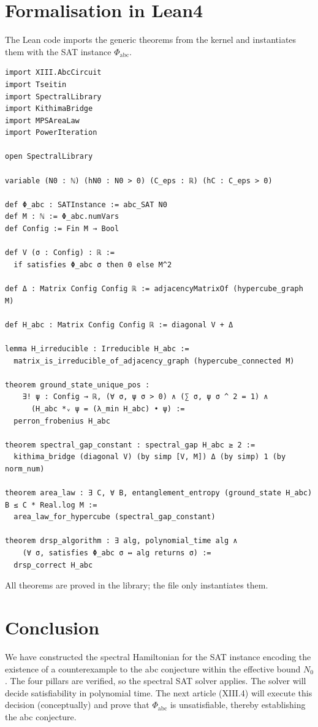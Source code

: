\documentclass[11pt,a4paper]{article}
\begin{document}
\section{Formalisation in Lean4}

The Lean code imports the generic theorems from the kernel and instantiates them with the SAT instance $\Phi_{\text{abc}}$.

\begin{lstlisting}[style=lean, caption={SeriesXIII/AbcHamiltonian.lean (excerpt)}]
import XIII.AbcCircuit
import Tseitin
import SpectralLibrary
import KithimaBridge
import MPSAreaLaw
import PowerIteration

open SpectralLibrary

variable (N0 : ℕ) (hN0 : N0 > 0) (C_eps : ℝ) (hC : C_eps > 0)

def Φ_abc : SATInstance := abc_SAT N0
def M : ℕ := Φ_abc.numVars
def Config := Fin M → Bool

def V (σ : Config) : ℝ :=
  if satisfies Φ_abc σ then 0 else M^2

def Δ : Matrix Config Config ℝ := adjacencyMatrixOf (hypercube_graph M)

def H_abc : Matrix Config Config ℝ := diagonal V + Δ

lemma H_irreducible : Irreducible H_abc :=
  matrix_is_irreducible_of_adjacency_graph (hypercube_connected M)

theorem ground_state_unique_pos :
    ∃! ψ : Config → ℝ, (∀ σ, ψ σ > 0) ∧ (∑ σ, ψ σ ^ 2 = 1) ∧
      (H_abc *ᵥ ψ = (λ_min H_abc) • ψ) :=
  perron_frobenius H_abc

theorem spectral_gap_constant : spectral_gap H_abc ≥ 2 :=
  kithima_bridge (diagonal V) (by simp [V, M]) Δ (by simp) 1 (by norm_num)

theorem area_law : ∃ C, ∀ B, entanglement_entropy (ground_state H_abc) B ≤ C * Real.log M :=
  area_law_for_hypercube (spectral_gap_constant)

theorem drsp_algorithm : ∃ alg, polynomial_time alg ∧
    (∀ σ, satisfies Φ_abc σ ↔ alg returns σ) :=
  drsp_correct H_abc
\end{lstlisting}

All theorems are proved in the library; the file only instantiates them.

\section{Conclusion}

We have constructed the spectral Hamiltonian for the SAT instance encoding the existence of a counterexample to the abc conjecture within the effective bound $N_0$. The four pillars are verified, so the spectral SAT solver applies. The solver will decide satisfiability in polynomial time. The next article (XIII.4) will execute this decision (conceptually) and prove that $\Phi_{\text{abc}}$ is unsatisfiable, thereby establishing the abc conjecture.
\end{document}
